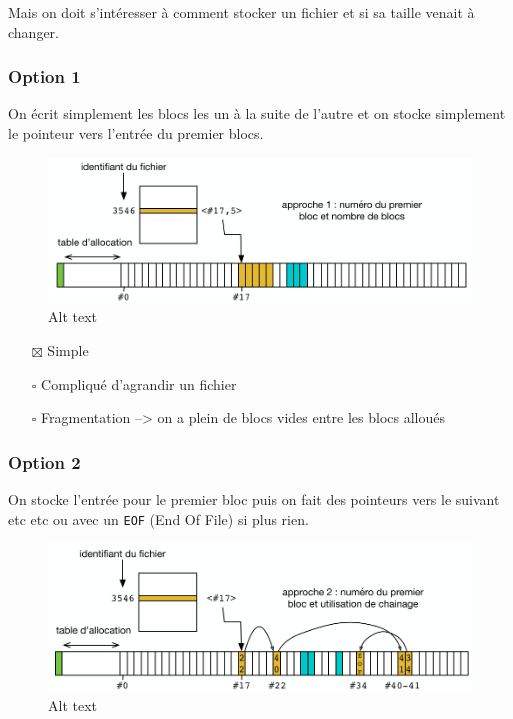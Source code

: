 Mais on doit s'intéresser à comment stocker un fichier et si sa taille
venait à changer.

\subsubsection{Option 1}\label{option-1}

On écrit simplement les blocs les un à la suite de l'autre et on stocke
simplement le pointeur vers l'entrée du premier blocs.

\begin{figure}
\centering
\includegraphics{image-41.png}
\caption{Alt text}
\end{figure}

\begin{itemize}
\tightlist
\item[$\boxtimes$]
  Simple
\item[$\square$]
  Compliqué d'agrandir un fichier
\item[$\square$]
  Fragmentation --\textgreater{} on a plein de blocs vides entre les
  blocs alloués
\end{itemize}

\subsubsection{Option 2}\label{option-2}

On stocke l'entrée pour le premier bloc puis on fait des pointeurs vers
le suivant etc etc ou avec un \texttt{EOF} (End Of File) si plus rien.

\begin{figure}
\centering
\includegraphics{image-42.png}
\caption{Alt text}
\end{figure}

